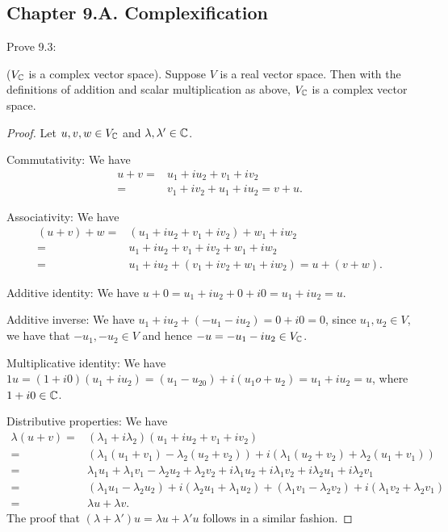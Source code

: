 \subsection*{Chapter 9.A. Complexification}


\begin{exercise}{1}
  Prove 9.3:

  ($V_{\mathbb{C}}$ is a complex vector space). Suppose $V$ is a real vector space. Then with the definitions of addition and scalar multiplication as above, $V_{\mathbb{C}}$ is a complex vector space.
\end{exercise}
\begin{proof}
 Let $u,v,w\in V_{\mathbb{C}}$ and $\lambda,\lambda'\in\mathbb{C}$.

 Commutativity: We have 
 \begin{align*}
     u+v =& 
     u_1+iu_2+v_1+iv_2\\ 
     =& v_1+iv_2+u_1+iu_2 =v+u.
 \end{align*}

 Associativity: We have 
 \begin{align*}
    (u+v)+w =& 
    (u_1+iu_2+v_1+iv_2)+w_1+iw_2\\ 
    =& u_1+iu_2+v_1+iv_2+w_1+iw_2\\ 
    =& u_1+iu_2+(v_1+iv_2+w_1+iw_2) =u+(v+w).   
 \end{align*}

 Additive identity: We have $u+0 = u_1+iu_2+0+i0 =u_1+iu_2 =u$.

 Additive inverse: We have $u_1+iu_2+(-u_1-iu_2) =0+i0 =0$, since $u_1,u_2\in V$, we have that $-u_1,-u_2\in V$ and hence $-u=-u_1-iu_2\in V_{\mathbb{C}}$.

 Multiplicative identity: We have $1u =(1+i0)(u_1+iu_2) =(u_1-u_20)+i(u_1o+u_2) =u_1+iu_2 =u$, where $1+i0\in\mathbb{C}$.

 Distributive properties: We have
 \begin{align*}
     \lambda(u+v) =& 
     (\lambda_1+i\lambda_2)(u_1+iu_2+v_1+iv_2)\\ 
     =& (\lambda_1(u_1+v_1)-\lambda_2(u_2+v_2))
     +i(\lambda_1(u_2+v_2)+\lambda_2(u_1+v_1))\\
     =& \lambda_1u_1+\lambda_1v_1-\lambda_2u_2+\lambda_2v_2
     +i\lambda_1u_2+i\lambda_1v_2+i\lambda_2u_1+i\lambda_2v_1\\ 
     =& (\lambda_1u_1-\lambda_2u_2)+i(\lambda_2u_1+\lambda_1u_2)
     +(\lambda_1v_1-\lambda_2v_2)+i(\lambda_1v_2+\lambda_2v_1)\\ 
     =& \lambda u + \lambda v.
 \end{align*} 
 The proof that $(\lambda+\lambda')u =\lambda u+\lambda' u$ follows in a similar fashion.
\end{proof}

